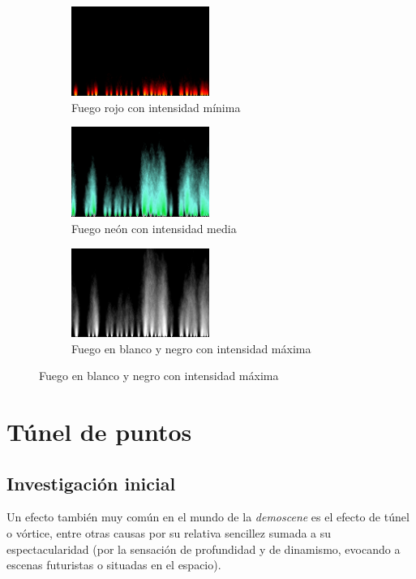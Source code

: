 \begin{figure}[h]
	\centering
	\begin{subfigure}[b]{0.3\textwidth}
		\centering
		\includegraphics[width=4.5cm]{archivos/fire_final1}
		\caption{Fuego rojo con intensidad mínima}
		\label{fig:fire_final1}
	\end{subfigure}
	\begin{subfigure}[b]{0.3\textwidth}
		\centering
		\includegraphics[width=4.5cm]{archivos/fire_final2}
		\caption{Fuego neón con intensidad media}
		\label{fig:fire_final2}
	\end{subfigure}
	\begin{subfigure}[b]{0.3\textwidth}
		\centering
		\includegraphics[width=4.5cm]{archivos/fire_final3}
		\caption{Fuego en blanco y negro con intensidad máxima}
		\label{fig:fire_final3}
	\end{subfigure}
\end{figure}

\section{Túnel de puntos}

\subsection{Investigación inicial}

Un efecto también muy común en el mundo de la \emph{demoscene} es el efecto de túnel o vórtice, entre otras causas por su relativa sencillez sumada a su espectacularidad (por la sensación de profundidad y de dinamismo, evocando a escenas futuristas o situadas en el espacio).\\

